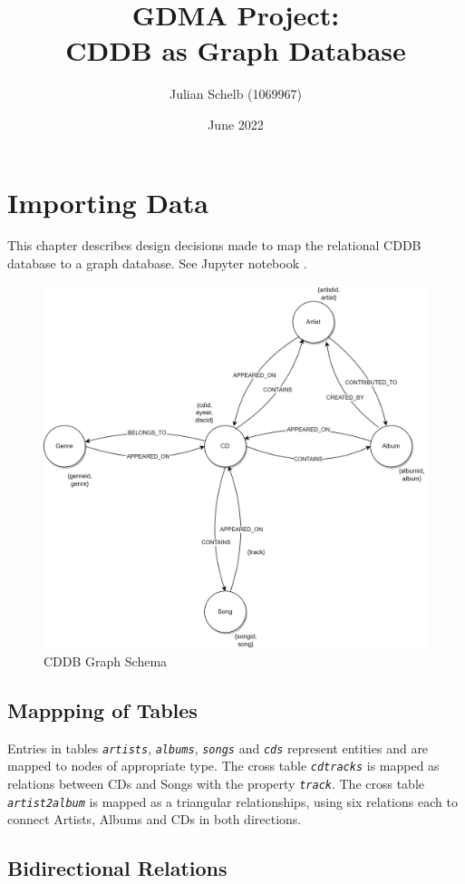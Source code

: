 \documentclass{article}
\title{GDMA Project: \\ CDDB as Graph Database}
\author{Julian Schelb (1069967)}
\date{June 2022}
\newcommand{\name}[1]{\texttt{\emph{#1}}}
\begin{document}
\maketitle

\section{Importing Data}

This chapter describes design decisions made to map the relational CDDB database to a graph database. See Jupyter notebook .

\begin{figure}[ht]
    \centering
    \includegraphics[width=11.5cm]{../Figures/cddb_as_graph-Default.png}
    \caption{CDDB Graph Schema }
\end{figure}

\subsection{Mappping of Tables}
Entries in tables \name{artists}, \name{albums}, \name{songs} and \name{cds} represent entities and are mapped to nodes of appropriate type. The cross table  \name{cdtracks} is mapped as relations between CDs and Songs with the property \name{track}. The cross table  \name{artist2album} is mapped as a triangular relationships, using six relations each to connect Artists, Albums and CDs in both directions.

\subsection{Bidirectional Relations}
\end{document}
